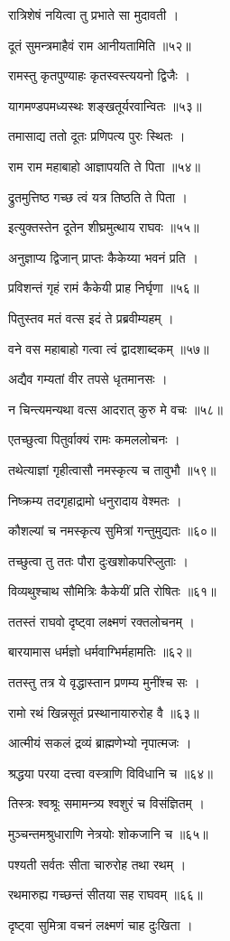 रात्रिशेषं नयित्वा तु प्रभाते सा मुदावती ।

दूतं सुमन्त्रमाहैवं राम आनीयतामिति ॥५२॥

रामस्तु कृतपुण्याहः कृतस्वस्त्ययनो द्विजैः ।

यागमण्डपमध्यस्थः शङ्खतूर्यरवान्वितः ॥५३॥

तमासाद्य ततो दूतः प्रणिपत्य पुरः स्थितः ।

राम राम महाबाहो आज्ञापयति ते पिता ॥५४॥

द्रुतमुत्तिष्ठ गच्छ त्वं यत्र तिष्ठति ते पिता ।

इत्युक्तस्तेन दूतेन शीघ्रमुत्थाय राघवः ॥५५॥

अनुज्ञाप्य द्विजान् प्राप्तः कैकेय्या भवनं प्रति ।

प्रविशन्तं गृहं रामं कैकेयी प्राह निर्घृणा ॥५६॥

पितुस्तव मतं वत्स इदं ते प्रब्रवीम्यहम् ।

वने वस महाबाहो गत्वा त्वं द्वादशाब्दकम् ॥५७॥

अद्यैव गम्यतां वीर तपसे धृतमानसः ।

न चिन्त्यमन्यथा वत्स आदरात् कुरु मे वचः ॥५८॥

एतच्छुत्वा पितुर्वाक्यं रामः कमललोचनः ।

तथेत्याज्ञां गृहीत्वासौ नमस्कृत्य च तावुभौ ॥५९॥

निष्क्रम्य तदगृहाद्रामो धनुरादाय वेश्मतः ।

कौशल्यां च नमस्कृत्य सुमित्रां गन्तुमुद्यतः ॥६०॥

तच्छुत्वा तु ततः पौरा दुःखशोकपरिप्लुताः ।

विव्यथुश्चाथ सौमित्रिः कैकेयीं प्रति रोषितः ॥६१॥

ततस्तं राघवो दृष्ट्वा लक्ष्मणं रक्तलोचनम् ।

बारयामास धर्मज्ञो धर्मवाग्भिर्महामतिः ॥६२॥

ततस्तु तत्र ये वृद्धास्तान प्रणम्य मुनींश्च सः ।

रामो रथं खिन्नसूतं प्रस्थानायारुरोह वै ॥६३॥

आत्मीयं सकलं द्रव्यं ब्राह्मणेभ्यो नृपात्मजः ।

श्रद्धया परया दत्त्वा वस्त्राणि विविधानि च ॥६४॥

तिस्त्रः श्वश्रूः समामन्त्र्य श्वशुरं च विसंज्ञितम् ।

मुञ्चन्तमश्रुधाराणि नेत्रयोः शोकजानि च ॥६५॥

पश्यती सर्वतः सीता चारुरोह तथा रथम् ।

रथमारुह्य गच्छन्तं सीतया सह राघवम् ॥६६॥

दृष्ट्वा सुमित्रा वचनं लक्ष्मणं चाह दुःखिता ।

